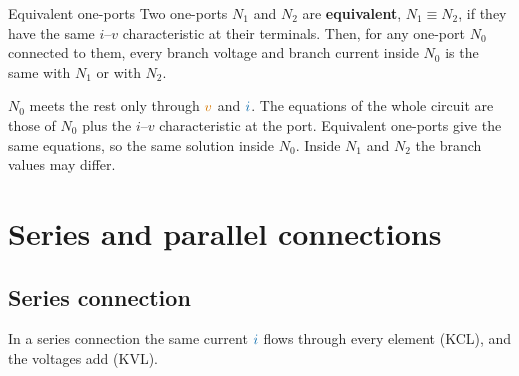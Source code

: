 \documentclass[11pt,a4paper]{article}
\newcommand{\Icol}[1]{\textcolor{ccur}{#1}}
\newcommand{\Vcol}[1]{\textcolor{cvolt}{#1}}
\newcommand{\portlabels}[1]{%
  \draw[fill=white] (#1,1.6) circle (1.8pt) node[above=1pt, font=\small] {$a$};
  \draw[fill=white] (#1,0.4) circle (1.8pt) node[below=1pt, font=\small] {$b$};
  \draw[iar] (#1-0.78,1.84) -- (#1-0.22,1.84);
  \node[font=\small, text=ccur] at (#1-0.5,2.12) {$i$};
  \node[pol] at (#1,1.28) {$+$}; \node[pol] at (#1,0.72) {$-$};
  \node[font=\small, text=cvolt] at (#1+0.3,1.0) {$v$};}
\newcommand{\pairbox}[2]{%
  \draw[elem] (0,0) rectangle (1.7,2.0); \node at (0.85,1.0) {#1};
  \draw[elem] (3.5,0) rectangle (5.2,2.0); \node at (4.35,1.0) {#2};
  \draw (1.7,1.6) -- (3.5,1.6); \draw (1.7,0.4) -- (3.5,0.4);
  \portlabels{2.6}}
\begin{document}
\begin{definitionbox}{Equivalent one-ports}
Two one-ports $N_1$ and $N_2$ are \textbf{equivalent}, $N_1 \equiv N_2$, if they have the
same $i$--$v$ characteristic at their terminals. Then, for any one-port $N_0$ connected to
them, every branch voltage and branch current inside $N_0$ is the same with $N_1$ or with
$N_2$.
\end{definitionbox}

\noindent\begin{minipage}[c]{0.46\linewidth}
\centering
{}\hspace{2mm}
\end{minipage}\hfill
\begin{minipage}[c]{0.52\linewidth}
$N_0$ meets the rest only through $\Vcol{v}$ and $\Icol{i}$. The equations of the whole
circuit are those of $N_0$ plus the $i$--$v$ characteristic at the port. Equivalent one-ports
give the same equations, so the same solution inside $N_0$. Inside $N_1$ and $N_2$ the
branch values may differ.
\end{minipage}

\section{Series and parallel connections}

\subsection*{Series connection}
In a series connection the same current $\Icol{i}$ flows through every element (KCL), and
the voltages add (KVL).
\end{document}
